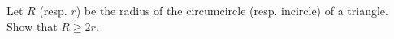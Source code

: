 Let $R$ (resp. $r$) be the radius of the circumcircle (resp. incircle) of a triangle. Show that $R \geq 2r$.
